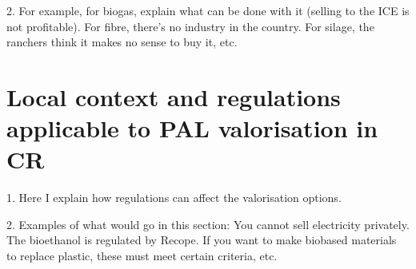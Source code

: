 2. For example, for biogas, explain what can be done with it (selling to the ICE is not profitable). For fibre, there's no industry in the country. For silage, the ranchers think it makes no sense to buy it, etc.

\section{Local context and regulations applicable to PAL valorisation in CR}

1. Here I explain how regulations can affect the valorisation options.

2. Examples of what would go in this section: You cannot sell electricity privately. The bioethanol is regulated by Recope. If you want to make biobased materials to replace plastic, these must meet certain criteria, etc.



